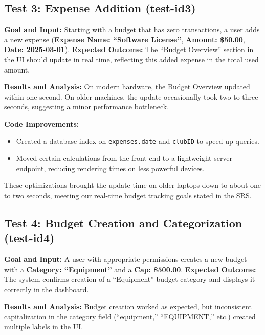 \documentclass[12pt, titlepage]{article}
\begin{document}

\subsection{Test 3: Expense Addition (test-id3)}

\noindent
\textbf{Goal and Input:}  
Starting with a budget that has zero transactions, a user adds a new expense (\textbf{Expense Name: “Software License”}, \textbf{Amount: \$50.00}, \textbf{Date: 2025-03-01}).  
\textbf{Expected Outcome:} The “Budget Overview” section in the UI should update in real time, reflecting this added expense in the total used amount.

\noindent
\textbf{Results and Analysis:}  
On modern hardware, the Budget Overview updated within one second. On older machines, the update occasionally took two to three seconds, suggesting a minor performance bottleneck.

\noindent
\textbf{Code Improvements:}
\begin{itemize}
  \item Created a database index on \texttt{expenses.date} and \texttt{clubID} to speed up queries.
  \item Moved certain calculations from the front-end to a lightweight server endpoint, reducing rendering times on less powerful devices.
\end{itemize}
These optimizations brought the update time on older laptops down to about one to two seconds, meeting our real-time budget tracking goals stated in the SRS.


\subsection{Test 4: Budget Creation and Categorization (test-id4)}

\noindent
\textbf{Goal and Input:}  
A user with appropriate permissions creates a new budget with a \textbf{Category: “Equipment”} and a \textbf{Cap: \$500.00}.  
\textbf{Expected Outcome:} The system confirms creation of a “Equipment” budget category and displays it correctly in the dashboard.

\noindent
\textbf{Results and Analysis:}  
Budget creation worked as expected, but inconsistent capitalization in the category field (“equipment,” “EQUIPMENT,” etc.) created multiple labels in the UI.
\end{document}
